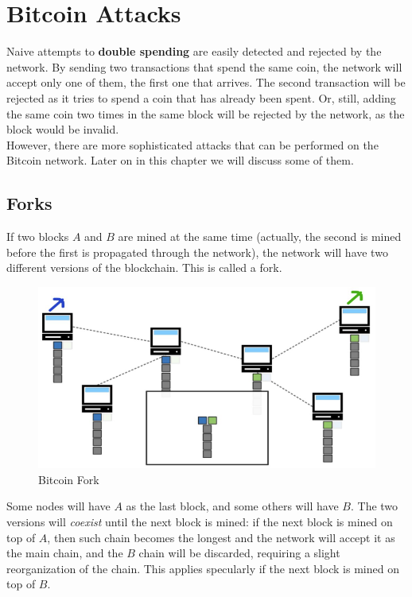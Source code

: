\chapter{Bitcoin Attacks}

Naive attempts to \textbf{double spending} are easily detected and rejected by the network.
By sending two transactions that spend the same coin, the network will accept only one of them, the first one that arrives. The second transaction will be rejected as it tries to spend a coin that has already been spent.
Or, still, adding the same coin two times in the same block will be rejected by the network, as the block would be invalid.\\
However, there are more sophisticated attacks that can be performed on the Bitcoin network. Later on in this chapter we will discuss some of them.

\section{Forks}
If two blocks $A$ and $B$ are mined at the same time (actually, the second is mined before the first is propagated through the network), the network will have two different versions of the blockchain. This is called a fork.
\begin{paracol}{2}
   \colfill	
   \begin{figure}[htbp]
      \centering
      \includegraphics{images/bitcoin_fork.png}
      \caption{Bitcoin Fork}
      \label{fig:bitcoin_fork}
   \end{figure}
   \colfill
   \switchcolumn
   Some nodes will have $A$ as the last block, and some others will have $B$. 
   The two versions will \textit{coexist} until the next block is mined: if the next block is mined on top of $A$, then such chain becomes the longest and the network will accept it as the main chain, and the $B$ chain will be discarded, requiring a slight reorganization of the chain. This applies specularly if the next block is mined on top of $B$.
\end{paracol}

